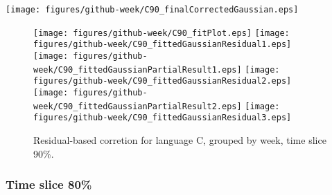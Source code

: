 \begin{center}
{\texttt{[image: figures/github-week/C90\_finalCorrectedGaussian.eps]}}
\end{center}

\FloatBarrier

\begin{figure}[t]
\centering
{}
{\texttt{[image: figures/github-week/C90\_fitPlot.eps]}}
{\texttt{[image: figures/github-week/C90\_fittedGaussianResidual1.eps]}}
{\texttt{[image: figures/github-week/C90\_fittedGaussianPartialResult1.eps]}}
{\texttt{[image: figures/github-week/C90\_fittedGaussianResidual2.eps]}}
{\texttt{[image: figures/github-week/C90\_fittedGaussianPartialResult2.eps]}}
{\texttt{[image: figures/github-week/C90\_fittedGaussianResidual3.eps]}}
\caption{Residual-based corretion for language C, grouped by week, time slice 90\%.}
\end{figure}


\FloatBarrier


\subsubsection{Time slice 80\%}

